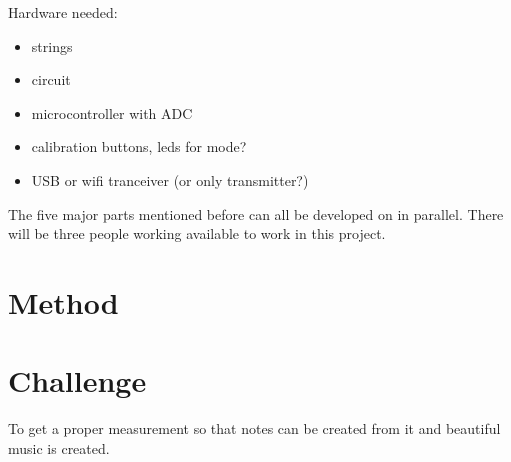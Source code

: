 \documentclass{article}
\begin{document}
Hardware needed:
\begin{itemize}
    \item strings
    \item circuit
    \item microcontroller with ADC
    \item calibration buttons, leds for mode?
    \item USB or wifi tranceiver (or only transmitter?)
\end{itemize}

The five major parts mentioned before can all be developed on in parallel. There will be three people working available to work in this project.

\section{Method}

\section{Challenge}
To get a proper measurement so that notes can be created from it and beautiful music is created.
\end{document}
